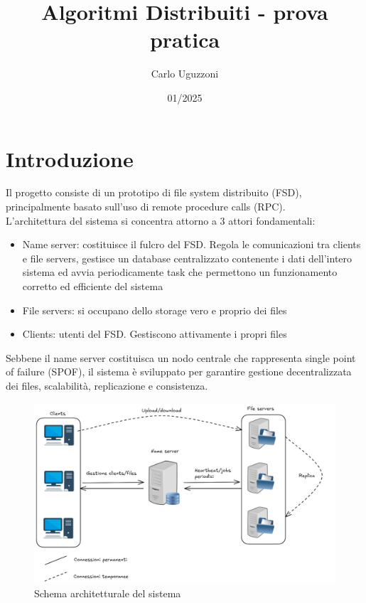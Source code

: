 \documentclass[a4paper, 12pt]{scrreprt}
\begin{document}
    \title{Algoritmi Distribuiti - prova pratica}
    \date{01/2025}
    \author{Carlo Uguzzoni}

    \maketitle

    \tableofcontents
    \thispagestyle{empty}

    \newpage
    \setcounter{page}{1}

    \chapter{Introduzione}

        Il progetto consiste di un prototipo di file system distribuito (FSD), principalmente basato sull'uso di remote procedure calls (RPC).\\
        L'architettura del sistema si concentra attorno a 3 attori fondamentali:

        \begin{itemize}

            \item Name server: costituisce il fulcro del FSD. Regola le comunicazioni tra clients e file servers, gestisce un database centralizzato contenente i dati dell'intero sistema ed avvia periodicamente task che permettono un funzionamento corretto ed efficiente del sistema

            \item File servers: si occupano dello storage vero e proprio dei files

            \item Clients: utenti del FSD. Gestiscono attivamente i propri files

        \end{itemize}

        Sebbene il name server costituisca un nodo centrale che rappresenta single point of failure (SPOF), il sistema è sviluppato per garantire gestione decentralizzata dei files, scalabilità, replicazione e consistenza.

        \begin{figure}[H]
            \centering
            \includegraphics[width = .6 \textwidth]{img/architettura.png}
            \caption{Schema architetturale del sistema}
        \end{figure}
\end{document}
